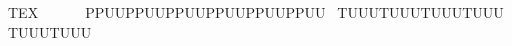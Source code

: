 TEX                                                     PPUU    PPUU    PPUU    PPUU    PPUU    PPUU             TUUU    TUUU    TUUU    TUUU    TUUU    TUUU